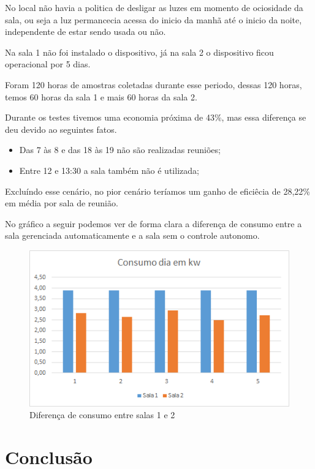 \documentclass[openright]{normas-utf-tex} %
\begin{document}
No local não havia a politica de desligar as luzes em momento de ociosidade da sala, ou seja a luz permancecia acessa do inicio da manhã até o inicio da noite, independente de estar sendo usada ou não. 

Na sala 1 não foi instalado o dispositivo, já na sala 2 o dispositivo ficou operacional por 5 dias.

Foram 120 horas de amostras coletadas durante esse periodo, dessas 120 horas, temos 60 horas da sala 1 e mais 60 horas da sala 2.

Durante os testes tivemos uma economia próxima de 43\%, mas essa diferença se deu devido ao seguintes fatos. 

\begin{itemize}
    \item Das 7 às 8 e das 18 às 19 não são realizadas reuniões;
    \item Entre 12 e 13:30 a sala também não é utilizada;
\end{itemize}

Excluíndo esse cenário, no pior cenário teríamos um ganho de eficiêcia de 28,22\% em média por sala de reunião.

No gráfico a seguir podemos ver de forma clara a diferença de consumo entre a sala gerenciada automaticamente e a sala sem o controle autonomo. 

\begin{figure}[!htb]
     \centering
     \includegraphics[scale=0.8]{g2.png}
     \caption{Diferença de consumo entre salas 1 e 2}
     \label{}
\end{figure}




\chapter{Conclusão}
\end{document}

